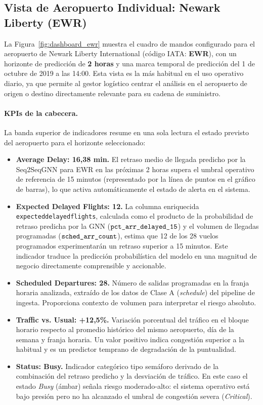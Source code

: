 \documentclass[12pt,oneside,a4paper]{report}
\renewcommand{\_}{\textunderscore\allowbreak}
\begin{document}
\subsection{Vista de Aeropuerto Individual: Newark Liberty (EWR)}
\label{sub:vista_ewr}

La Figura~\ref{fig:dashboard_ewr} muestra el cuadro de mandos configurado para el aeropuerto de Newark Liberty International (código IATA: \textbf{EWR}), con un horizonte de predicción de \textbf{2 horas} y una marca temporal de predicción del 1 de octubre de 2019 a las 14:00. Esta vista es la más habitual en el uso operativo diario, ya que permite al gestor logístico centrar el análisis en el aeropuerto de origen o destino directamente relevante para su cadena de suministro.

\paragraph{KPIs de la cabecera.}
La banda superior de indicadores resume en una sola lectura el estado previsto del aeropuerto para el horizonte seleccionado:

\begin{itemize}
    \item \textbf{Average Delay: 16,38 min.} El retraso medio de llegada predicho por la Seq2SeqGNN para EWR en las próximas 2 horas supera el umbral operativo de referencia de 15 minutos (representado por la línea de puntos en el gráfico de barras), lo que activa automáticamente el estado de alerta en el sistema.
    \item \textbf{Expected Delayed Flights: 12.} La columna enriquecida \texttt{expected\_delayed\_flights}, calculada como el producto de la probabilidad de retraso predicha por la GNN ($\texttt{pct\_arr\_delayed\_15}$) y el volumen de llegadas programadas ($\texttt{sched\_arr\_count}$), estima que 12 de los 28 vuelos programados experimentarán un retraso superior a 15 minutos. Este indicador traduce la predicción probabilística del modelo en una magnitud de negocio directamente comprensible y accionable.
    \item \textbf{Scheduled Departures: 28.} Número de salidas programadas en la franja horaria analizada, extraído de los datos de Clase A (\textit{schedule}) del pipeline de ingesta. Proporciona contexto de volumen para interpretar el riesgo absoluto.
    \item \textbf{Traffic vs. Usual: +12,5\%.} Variación porcentual del tráfico en el bloque horario respecto al promedio histórico del mismo aeropuerto, día de la semana y franja horaria. Un valor positivo indica congestión superior a la habitual y es un predictor temprano de degradación de la puntualidad.
    \item \textbf{Status: Busy.} Indicador categórico tipo semáforo derivado de la combinación del retraso predicho y la desviación de tráfico. En este caso el estado \textit{Busy} (ámbar) señala riesgo moderado-alto: el sistema operativo está bajo presión pero no ha alcanzado el umbral de congestión severa (\textit{Critical}).
\end{itemize}
\end{document}
